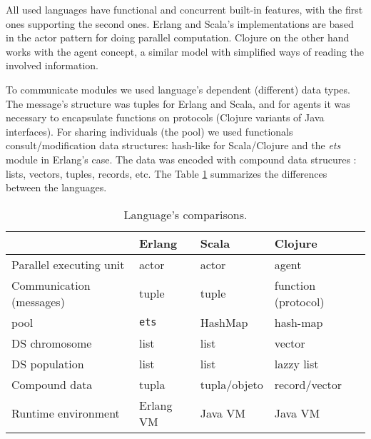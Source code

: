 
All used languages have functional and concurrent built-in features, with the first ones supporting the second ones. Erlang and Scala’s implementations are based in the actor pattern for doing parallel computation. Clojure on the other hand works with the agent concept, a similar model with simplified ways of reading the involved information.

To communicate modules we used language’s dependent (different) data types. The message's structure was tuples for Erlang and Scala, and for agents it was necessary to encapsulate functions on protocols (Clojure variants of Java interfaces). For sharing individuals (the pool) we used functionals consult/modification data structures: hash-like for Scala/Clojure and the {\em ets} module in Erlang’s case. The data was encoded with compound data strucures : lists, vectors, tuples, records, etc. The Table \ref{tb:res:comp} summarizes the differences between the languages.

\begin{table}
  \caption{Language's comparisons.}\label{tb:res:comp}
  \centering
  \begin{tabular}{|p{4cm}|>{\centering}p{3cm}|>{\centering}p{3cm}|>{\centering}p{3cm}|}
    \hline
     & \textbf{Erlang} & \textbf{Scala} & \textbf{Clojure} \tabularnewline
    \hline
    Parallel executing unit & actor & actor & agent \tabularnewline
    \hline
    Communication (messages) & tuple & tuple & function (protocol) \tabularnewline
    \hline
    pool & \texttt{ets} & HashMap & hash-map \tabularnewline
    \hline
    DS chromosome & list & list & vector \tabularnewline
    \hline
    DS population & list & list & lazzy list \tabularnewline
    \hline
    Compound data & tupla & tupla/objeto & record/vector \tabularnewline
    \hline
    Runtime environment & Erlang VM& Java VM& Java VM \tabularnewline
    \hline
  \end{tabular}

\end{table}


